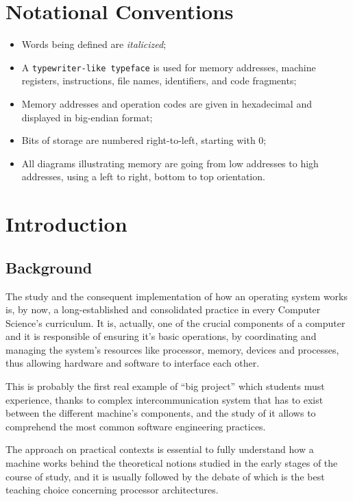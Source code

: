 \documentclass[12pt,a4paper,openright,twoside]{report}
\begin{document}
\chapter*{Notational Conventions}
\begin{itemize}
  \item Words being defined are \textit{italicized};
  \item A \texttt{typewriter-like typeface} is used for memory addresses, machine registers, instructions, file names, identifiers, and code fragments;
  \item Memory addresses and operation codes are given in hexadecimal and displayed in big-endian format;
  \item Bits of storage are numbered right-to-left, starting with 0;
  \item All diagrams illustrating memory are going from low addresses to high addresses, using a left to right, bottom to top orientation.
\end{itemize}

\clearpage{\pagestyle{empty}\cleardoublepage}
\chapter{Introduction}
\lhead[\fancyplain{}{\bfseries\thepage}]{\fancyplain{}{\bfseries\rightmark}}

\section{Background}
	The study and the consequent implementation of how an operating system works is, by now, a long-established and consolidated practice in every Computer Science's curriculum.
	It is, actually, one of the crucial components of a computer and it is responsible of ensuring it's basic operations, by coordinating and managing the system's resources like processor, memory, devices and processes, thus allowing hardware and software to interface each other.
	
	This is probably the first real example of ``big project'' which students must experience, thanks to complex intercommunication system that has to exist between the different machine's components, and the study of it allows to comprehend the most common software engineering practices.
	
	The approach on practical contexts is essential to fully understand how a machine works behind the theoretical notions studied in the early stages of the course of study, and it is usually followed by the debate of which is the best teaching choice concerning processor architectures.
	
\end{document}
